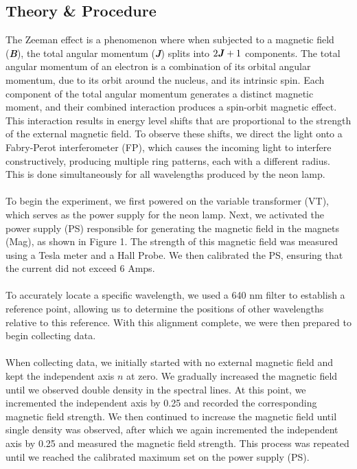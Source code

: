\documentclass[a4paper,12pt,english]{all-in-one} %
\begin{document}
\begin{multicols}{2}

\section*{Theory \& Procedure }
{
The Zeeman effect is a phenomenon where when subjected to a magnetic field (\textbf{\textit{B}}), the total angular momentum (\textbf{\textit{J}}) splits into $2\textbf{\textit{J}} + 1$ components. The total angular momentum of an electron is a combination of its orbital angular momentum, due to its orbit around the nucleus, and its intrinsic spin. Each component of the total angular momentum generates a distinct magnetic moment, and their combined interaction produces a spin-orbit magnetic effect. This interaction results in energy level shifts that are proportional to the strength of the external magnetic field. To observe these shifts, we direct the light onto a Fabry-Perot interferometer (FP), which causes the incoming light to interfere constructively, producing multiple ring patterns, each with a different radius. This is done simultaneously for all wavelengths produced by the neon lamp. 
\\
\\
To begin the experiment, we first powered on the variable transformer (VT), which serves as the power supply for the neon lamp. Next, we activated the power supply (PS) responsible for generating the magnetic field in the magnets (Mag), as shown in Figure 1. The strength of this magnetic field was measured using a Tesla meter and a Hall Probe. We then calibrated the PS, ensuring that the current did not exceed 6 Amps. 
\\
\\
To accurately locate a specific wavelength, we used a 640 nm filter to establish a reference point, allowing us to determine the positions of other wavelengths relative to this reference. With this alignment complete, we were then prepared to begin collecting data.
\\
\\ 
When collecting data, we initially started with no external magnetic field and kept the independent axis $n$ at zero. We gradually increased the magnetic field until we observed double density in the spectral lines. At this point, we incremented the independent axis by 0.25 and recorded the corresponding magnetic field strength. We then continued to increase the magnetic field until single density was observed, after which we again incremented the independent axis by 0.25 and measured the magnetic field strength. This process was repeated until we reached the calibrated maximum set on the power supply (PS).
}



\end{multicols}
\end{document}
